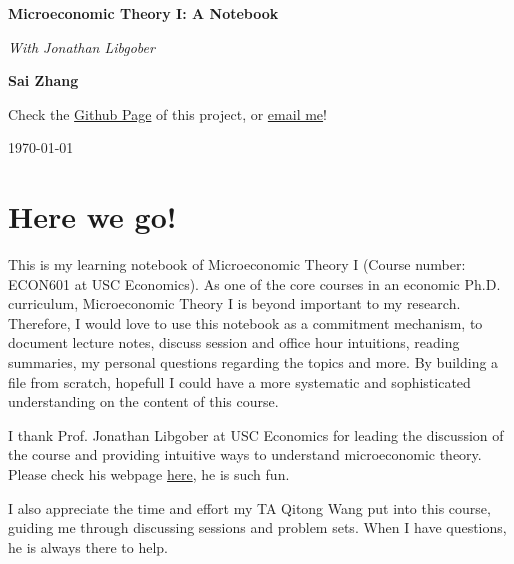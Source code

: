 \documentclass[12pt,openany]{report}
\theoremstyle{indented}
\numberwithin{definition}{section}
\numberwithin{theorem}{section}
\numberwithin{example}{section}
\begin{document}
\begin{titlepage}
    \begin{center}
        \vspace*{1cm}
        
        \Huge
        \textbf{Microeconomic Theory I: A Notebook}

        \Large
        \textit{With Jonathan Libgober}
            
        \vspace{2.5cm}
        
        \LARGE    
        \textbf{Sai Zhang}
            
        \vfill
        
        \large    
        Check the \href{https://github.com/SaiChrisZHANG/MicroEconLearning}{Github Page} of this project, or \href{mailto:saizhang.econ@gmail.com}{email me}!

        \vspace{0.8cm}
        \large
        \today
            
    \end{center}
\end{titlepage}


\chapter*{Here we go!}

This is my learning notebook of Microeconomic Theory I (Course number: ECON601 at USC Economics). As one of the core courses in 
an economic Ph.D. curriculum, Microeconomic Theory I is beyond important to my research. Therefore, I would love to use this notebook
as a commitment mechanism, to document lecture notes, discuss session and office hour intuitions, reading summaries, my personal questions
regarding the topics and more. By building a file from scratch, hopefull I could have a more systematic and sophisticated understanding on
the content of this course.

I thank Prof. Jonathan Libgober at USC Economics for leading the discussion of the course and providing intuitive ways to understand microeconomic theory.
Please check his webpage \href{https://www.jonlib.com/}{here}, he is such fun.

I also appreciate the time and effort my TA Qitong Wang put into this course, guiding me through discussing sessions and problem sets. When I have questions, he is 
always there to help.
\end{document}
